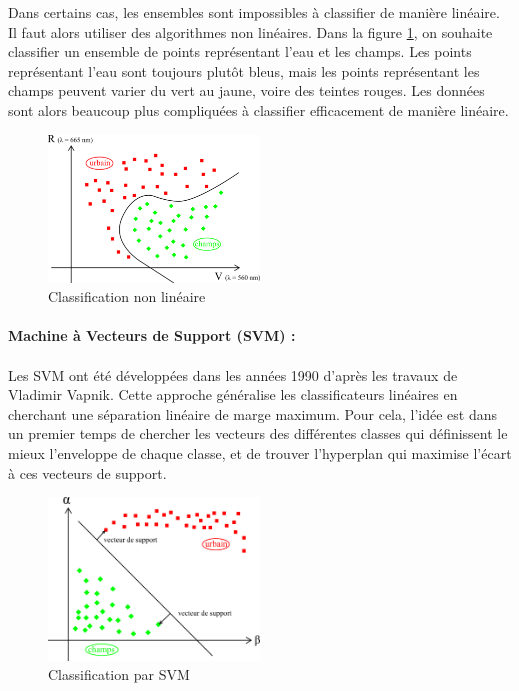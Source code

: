 \documentclass[a4paper,10pt]{article}
\begin{document}
Dans certains cas, les ensembles sont impossibles à classifier de manière linéaire. Il faut alors utiliser des algorithmes non linéaires. Dans la figure \ref{fig:ml_nlin}, on souhaite classifier un ensemble de points représentant l'eau et les champs. Les points représentant l'eau sont toujours plutôt bleus, mais les points représentant les champs peuvent varier du vert au jaune, voire des teintes rouges. Les données sont alors beaucoup plus compliquées à classifier efficacement de manière linéaire. 

\begin{figure}[H]
  \centering
    \includegraphics[width=0.5\textwidth]{ml_nlin}
  \caption{Classification non linéaire}
  \label{fig:ml_nlin}
\end{figure}

\paragraph{Machine à Vecteurs de Support (SVM) :}
\paragraph{}
Les SVM ont été développées dans les années 1990 d'après les travaux de Vladimir Vapnik. Cette approche généralise les classificateurs linéaires en cherchant une séparation linéaire de marge maximum. Pour cela, l'idée est dans un premier temps de chercher les vecteurs des différentes classes qui définissent le mieux l'enveloppe de chaque classe, et de trouver l'hyperplan qui maximise l'écart à ces vecteurs de support.

\begin{figure}[H]
  \centering
    \includegraphics[width=0.5\textwidth]{ml_svm}
  \caption{Classification par SVM}
  \label{fig:ml_svm}
\end{figure}
\end{document}
